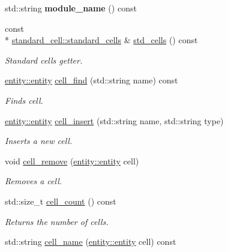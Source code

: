 \begin{DoxyCompactItemize}
\item 
\hypertarget{classophidian_1_1netlist_1_1netlist_abba837e971c71ddff96b387faf94b5ea}{std\-::string {\bfseries module\-\_\-name} () const }\label{classophidian_1_1netlist_1_1netlist_abba837e971c71ddff96b387faf94b5ea}

\item 
const \\*
\hyperlink{classophidian_1_1standard__cell_1_1standard__cells}{standard\-\_\-cell\-::standard\-\_\-cells} \& \hyperlink{classophidian_1_1netlist_1_1netlist_a61ec8a8325b9f5d7a476b95cdb2f96c1}{std\-\_\-cells} () const 
\begin{DoxyCompactList}\small\item\em Standard cells getter. \end{DoxyCompactList}\item 
\hyperlink{classophidian_1_1entity_1_1entity}{entity\-::entity} \hyperlink{classophidian_1_1netlist_1_1netlist_ac548c13bd3dd3bc244f994a8fa89705e}{cell\-\_\-find} (std\-::string name) const 
\begin{DoxyCompactList}\small\item\em Finds cell. \end{DoxyCompactList}\item 
\hyperlink{classophidian_1_1entity_1_1entity}{entity\-::entity} \hyperlink{classophidian_1_1netlist_1_1netlist_a232badb209a281fadfaa95e551649423}{cell\-\_\-insert} (std\-::string name, std\-::string type)
\begin{DoxyCompactList}\small\item\em Inserts a new cell. \end{DoxyCompactList}\item 
void \hyperlink{classophidian_1_1netlist_1_1netlist_a5d4eb18a9ba1b37fd0aa537a3ffdefc7}{cell\-\_\-remove} (\hyperlink{classophidian_1_1entity_1_1entity}{entity\-::entity} cell)
\begin{DoxyCompactList}\small\item\em Removes a cell. \end{DoxyCompactList}\item 
std\-::size\-\_\-t \hyperlink{classophidian_1_1netlist_1_1netlist_a5835db533e539df0a67385015bec7349}{cell\-\_\-count} () const 
\begin{DoxyCompactList}\small\item\em Returns the number of cells. \end{DoxyCompactList}\item 
std\-::string \hyperlink{classophidian_1_1netlist_1_1netlist_a4350770de004129ea4abc09e201deeba}{cell\-\_\-name} (\hyperlink{classophidian_1_1entity_1_1entity}{entity\-::entity} cell) const 

\end{DoxyCompactItemize}
